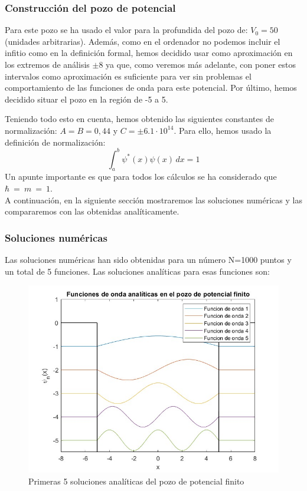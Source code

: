 \documentclass[12pt]{article}
\begin{document}
\subsubsection{Construcción del pozo de potencial}
Para este pozo se ha usado el valor para la profundida del pozo
de: $V_0=50$ (unidades arbitrarias). Además, como en el ordenador
no podemos incluir el infitio como en la definición formal, hemos 
decidido usar como aproximación en los extremos de análisis $\pm 8$ ya
que, como veremos más adelante, con poner estos intervalos como
aproximación es suficiente para ver sin problemas el comportamiento
de las funciones de onda para este potencial.
Por último, hemos decidido situar el pozo en la región de -5 a 5. \\
\par
Teniendo todo esto en cuenta, hemos obtenido las siguientes constantes
de normalización: $A=B=0,44$ y $C=\pm 6.1\cdot 10^{14}$. Para ello, hemos usado la definición
de normalización:
\begin{equation}
\int_{a}^{b} \psi^{*}(x) \psi(x) \,dx=1
\end{equation}
Un apunte importante es que para todos los cálculos se ha considerado
que $\hbar~=~m~=~1$. \\

A continuación, en la siguiente sección mostraremos las soluciones numéricas 
y las compararemos con las obtenidas analíticamente.

\subsubsection{Soluciones numéricas}

Las soluciones numéricas han sido obtenidas para un número 
N=1000 puntos y un total de 5 funciones. Las soluciones analíticas
para esas funciones son: 

\begin{figure}[H]
    \centering
    \includegraphics[width=1.0\textwidth]{analiticas.jpg}
    \caption{Primeras 5 soluciones analíticas del pozo de potencial finito}
\end{figure}
\end{document}
